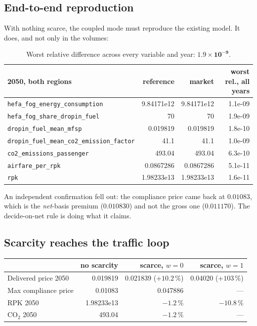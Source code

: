 \documentclass[11pt,a4paper]{article}
\newcommand{\var}[1]{\texttt{\small #1}}
\begin{document}
\subsection{End-to-end reproduction}
With nothing scarce, the coupled mode must reproduce the existing model. It does, and not
only in the volumes:

\begin{table}[h]
\centering\small
\begin{tabular}{@{}lrrr@{}}
\toprule
\textbf{2050, both regions} & \textbf{reference} & \textbf{market} & \textbf{worst rel., all years} \\
\midrule
\var{hefa\_fog\_energy\_consumption} & 9.84171e12 & 9.84171e12 & 1.1e-09 \\
\var{hefa\_fog\_share\_dropin\_fuel} & 70 & 70 & 1.9e-09 \\
\var{dropin\_fuel\_mean\_mfsp} & 0.019819 & 0.019819 & 1.8e-10 \\
\var{dropin\_fuel\_mean\_co2\_emission\_factor} & 41.1 & 41.1 & 1.0e-09 \\
\var{co2\_emissions\_passenger} & 493.04 & 493.04 & 6.3e-10 \\
\var{airfare\_per\_rpk} & 0.0867286 & 0.0867286 & 5.1e-11 \\
\var{rpk} & 1.98233e13 & 1.98233e13 & 1.6e-11 \\
\bottomrule
\end{tabular}
\caption{Worst relative difference across every variable and year: $\mathbf{1.9\times10^{-9}}$.}
\end{table}

\noindent An independent confirmation fell out: the compliance price came back at
$0.01083$, which is the \emph{net}-basis premium ($0.010830$) and not the gross one
($0.011170$). The decide-on-net rule is doing what it claims.

\subsection{Scarcity reaches the traffic loop}

\begin{table}[h]
\centering\small
\begin{tabular}{@{}lrrr@{}}
\toprule
 & \textbf{no scarcity} & \textbf{scarce, $w=0$} & \textbf{scarce, $w=1$} \\
\midrule
Delivered price 2050 & 0.019819 & 0.021839 ($+10.2\,\%$) & 0.04020 (\textbf{$+103\,\%$}) \\
Max compliance price & 0.01083 & 0.047886 & --- \\
RPK 2050 & 1.98233e13 & $-1.2\,\%$ & \textbf{$-10.8\,\%$} \\
CO$_2$ 2050 & 493.04 & $-1.2\,\%$ & --- \\
\bottomrule
\end{tabular}
\end{table}
\end{document}

